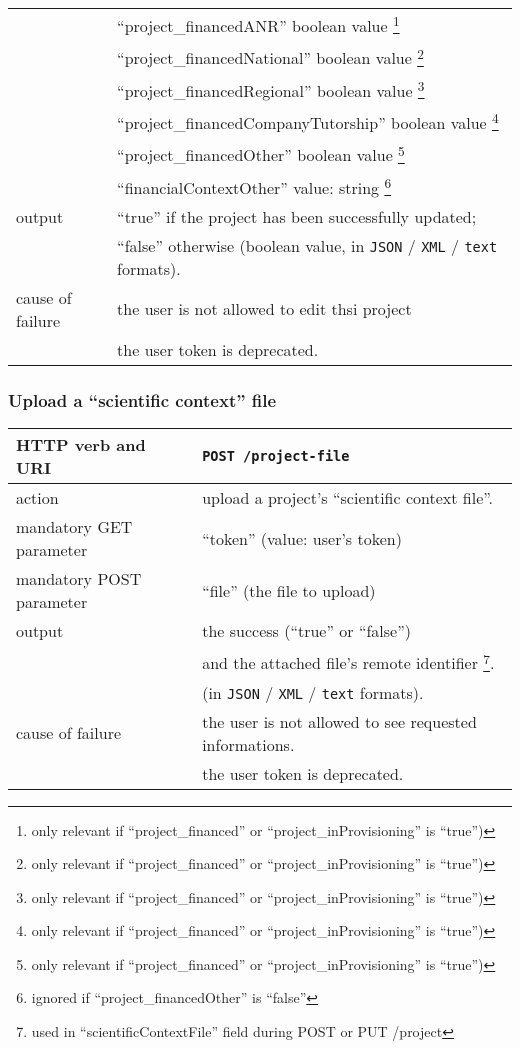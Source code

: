 \begin{tabular}{ | l | l | }
	\space & ``project\_financedANR'' boolean value \footnote{only relevant if ``project\_financed'' or ``project\_inProvisioning'' is ``true'')} \\
	\space & ``project\_financedNational'' boolean value \footnote{only relevant if ``project\_financed'' or ``project\_inProvisioning'' is ``true'')} \\
	\space & ``project\_financedRegional'' boolean value \footnote{only relevant if ``project\_financed'' or ``project\_inProvisioning'' is ``true'')} \\
	\space & ``project\_financedCompanyTutorship'' boolean value \footnote{only relevant if ``project\_financed'' or ``project\_inProvisioning'' is ``true'')} \\
	\space & ``project\_financedOther'' boolean value \footnote{only relevant if ``project\_financed'' or ``project\_inProvisioning'' is ``true'')} \\
	\space & ``financialContextOther'' value: string \footnote{ignored if ``project\_financedOther'' is ``false''} \\
	\hline
	output & ``true'' if the project has been successfully updated; \\
	\space & ``false'' otherwise (boolean value, in \texttt{JSON} / \texttt{XML} / \texttt{text} formats). \\
	\hline
	cause of failure &the user is not allowed to edit thsi project \\
	\space & the user token is deprecated. \\
	\hline
\end{tabular}
\newline

\subsubsection{Upload a ``scientific context'' file}
\begin{tabular}{ | l | l | }
	\hline
	HTTP verb and URI & \texttt{POST /project-file} \\
	\hline
	action & upload a project's ``scientific context file''. \\
	\hline
	mandatory GET parameter & ``token'' (value: user's token) \\
	\hline
	mandatory POST parameter & ``file'' (the file to upload) \\
	\hline
	output & the success (``true'' or ``false'')  \\
	\space & and the attached file's remote identifier \footnote{used in ``scientificContextFile'' field during POST or PUT /project}.  \\
	\space & (in \texttt{JSON} / \texttt{XML} / \texttt{text} formats). \\
	\hline
	cause of failure & the user is not allowed to see requested informations. \\
	\space & the user token is deprecated. \\
	\hline
\end{tabular}
\newline

